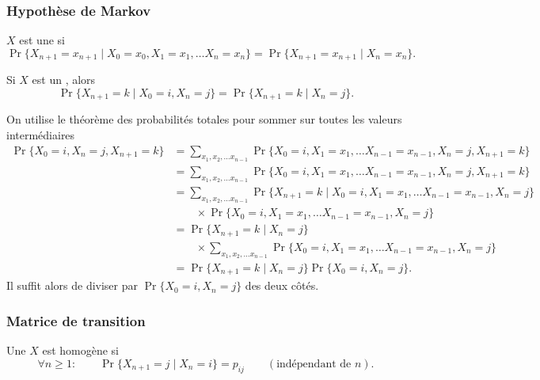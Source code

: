 \subsubsection{Hypothèse de Markov}

\begin{definition}[\CM]
  $X$ est une \cM si
  $$
  \Pr\{X_{n+1} = x_{n+1} \mid X_0 = x_0, X_1 = x_1, \dots X_n = x_n\} 
  = 
  \Pr\{X_{n+1} = x_{n+1} \mid X_n = x_n\}.
  $$
\end{definition}

\begin{proposition} \label{prop:loiConditionnalleEtatInitial}
  Si $X$ est un \cM, alors
  $$
  \Pr\{X_{n+1} = k \mid X_0 = i, X_n = j\} 
  = 
  \Pr\{X_{n+1} = k \mid X_n = j\}.
  $$
\end{proposition}

\proof
On utilise le théorème des probabilités totales pour sommer sur toutes les valeurs intermédiaires
  \begin{align*}
    \Pr\{X_0 = i, X_n = j, X_{n+1} = k\}
    & = \sum_{x_1, x_2, \dots x_{n-1}}
    \Pr\{X_0 = i, X_1 = x_1, \dots X_{n-1} = x_{n-1}, X_n = j, X_{n+1} = k\} \\
    & = \sum_{x_1, x_2, \dots x_{n-1}}
    \Pr\{X_0 = i, X_1 = x_1, \dots X_{n-1} = x_{n-1}, X_n = j, X_{n+1} = k\} \\
    & = \sum_{x_1, x_2, \dots x_{n-1}}
    \Pr\{X_{n+1} = k \mid X_0 = i, X_1 = x_1, \dots X_{n-1} = x_{n-1}, X_n = j\} \\
    & \qquad \times \Pr\{X_0 = i, X_1 = x_1, \dots X_{n-1} = x_{n-1}, X_n = j\} \\
    & = \Pr\{X_{n+1} = k \mid X_n = j\} \\
    & \qquad \times \sum_{x_1, x_2, \dots x_{n-1}} \Pr\{X_0 = i, X_1 = x_1, \dots X_{n-1} = x_{n-1}, X_n = j\} \\
    & = \Pr\{X_{n+1} = k \mid X_n = j\} \Pr\{X_0 = i, X_n = j\}.
  \end{align*}
  Il suffit alors de diviser par $\Pr\{X_0 = i, X_n = j\}$ des deux côtés. 
\eproof

\subsubsection{Matrice de transition}

\begin{definition}[\CM homogène]
  Une \cM $X$ est homogène si
  $$
  \forall n \geq 1: \qquad 
  \Pr\{X_{n+1} = j \mid X_n = i\} = p_{ij} 
  \qquad (\text{indépendant de $n$}).
  $$
\end{definition}

